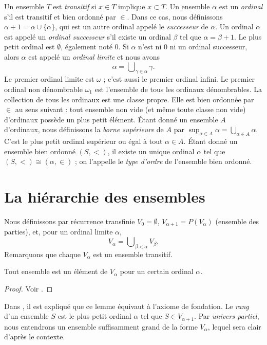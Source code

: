 \noindent
Un ensemble $T$ est {\it transitif} si $x\in T$ implique $x\subset T$.
Un ensemble $\alpha$ est un {\it ordinal} s'il est transitif et bien ordonné
par $\in$. Dans ce cas, nous définissons
$\alpha + 1 = \alpha \cup \{\alpha\}$, qui est un autre ordinal appelé le
{\it successeur} de $\alpha$. Un ordinal $\alpha$ est appelé un
{\it ordinal successeur} s'il existe un ordinal $\beta$ tel que
$\alpha = \beta + 1$. Le plus petit ordinal est $\emptyset$, également noté
$0$. Si $\alpha$ n'est ni $0$ ni un ordinal successeur, alors $\alpha$ est
appelé un {\it ordinal limite} et nous avons
$$
\alpha
=
\bigcup\nolimits_{\gamma \in \alpha} \gamma.
$$
Le premier ordinal limite est $\omega$ ; c'est aussi le premier ordinal
infini. Le premier ordinal non dénombrable $\omega_1$ est l'ensemble de tous
les ordinaux dénombrables. La collection de tous les ordinaux est une classe
propre. Elle est bien ordonnée par $\in$ au sens suivant : tout ensemble non
vide (et même toute classe non vide) d'ordinaux possède un plus petit élément.
Étant donné un ensemble $A$ d'ordinaux, nous définissons la {\it borne supérieure} de
$A$ par $\sup_{\alpha \in A} \alpha =
\bigcup_{\alpha \in A} \alpha$. C'est le plus petit ordinal supérieur ou égal
à tout $\alpha \in A$. Étant donné un ensemble bien ordonné $(S, <)$, il existe
un unique ordinal $\alpha$ tel que $(S, <) \cong (\alpha, \in)$ ; on l'appelle
le {\it type d'ordre} de l'ensemble bien ordonné.

\section{La hiérarchie des ensembles}
\label{section-sets-hierarchy}

\noindent
Nous définissons par récurrence transfinie $V_0 = \emptyset$,
$V_{\alpha + 1} = P(V_\alpha)$ (ensemble des parties), et, pour un ordinal
limite $\alpha$,
$$
V_\alpha = \bigcup\nolimits_{\beta < \alpha} V_\beta.
$$
Remarquons que chaque $V_\alpha$ est un ensemble transitif.

\begin{lemma}
\label{lemma-axiom-regularity}
Tout ensemble est un élément de $V_\alpha$ pour un certain ordinal $\alpha$.
\end{lemma}

\begin{proof}
Voir \cite[lemme 6.3]{Jech}.
\end{proof}

\noindent
Dans \cite[chapitre III]{Kunen}, il est expliqué que ce lemme équivaut à
l'axiome de fondation. Le {\it rang} d'un ensemble $S$ est le plus petit ordinal
$\alpha$ tel que $S \in V_{\alpha + 1}$. Par {\it univers partiel}, nous
entendrons un ensemble suffisamment grand de la forme $V_\alpha$, lequel sera
clair d'après le contexte.

